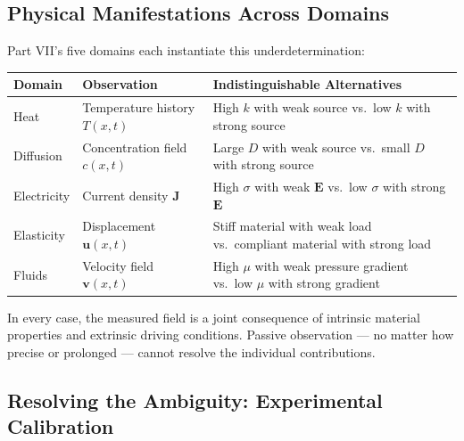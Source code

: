 \documentclass[
  letterpaper,
  DIV=11,
  numbers=noendperiod]{scrartcl}
\begin{document}
\subsection{Physical Manifestations Across
Domains}\label{physical-manifestations-across-domains}

Part VII's five domains each instantiate this underdetermination:

\begin{longtable}[]{@{}
  >{\raggedright\arraybackslash}p{}
  >{\raggedright\arraybackslash}p{}
  >{\raggedright\arraybackslash}p{}@{}}
\toprule\noalign{}
\begin{minipage}[b]{\linewidth}\raggedright
Domain
\end{minipage} & \begin{minipage}[b]{\linewidth}\raggedright
Observation
\end{minipage} & \begin{minipage}[b]{\linewidth}\raggedright
Indistinguishable Alternatives
\end{minipage} \\
\midrule\noalign{}
\endhead
\bottomrule\noalign{}
\endlastfoot
Heat & Temperature history \(T(x,t)\) & High \(k\) with weak source
vs.~low \(k\) with strong source \\
Diffusion & Concentration field \(c(x,t)\) & Large \(D\) with weak
source vs.~small \(D\) with strong source \\
Electricity & Current density \(\mathbf{J}\) & High \(\sigma\) with weak
\(\mathbf{E}\) vs.~low \(\sigma\) with strong \(\mathbf{E}\) \\
Elasticity & Displacement \(\mathbf{u}(x,t)\) & Stiff material with weak
load vs.~compliant material with strong load \\
Fluids & Velocity field \(\mathbf{v}(x,t)\) & High \(\mu\) with weak
pressure gradient vs.~low \(\mu\) with strong gradient \\
\end{longtable}

In every case, the measured field is a joint consequence of intrinsic
material properties and extrinsic driving conditions. Passive
observation --- no matter how precise or prolonged --- cannot resolve
the individual contributions.

\subsection{Resolving the Ambiguity: Experimental
Calibration}\label{resolving-the-ambiguity-experimental-calibration}
\end{document}

